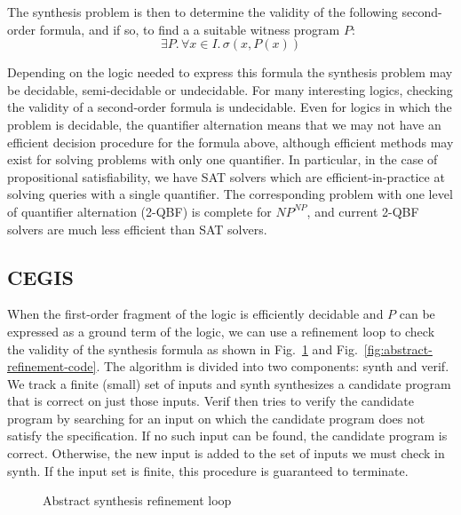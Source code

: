 \documentclass[a4paper]{llncs}
\begin{document}
The synthesis problem is then to determine the validity of the following
second-order formula, and if so, to find a a suitable witness program $P$:
%
$$\exists P .\, \forall x \in I.\, \sigma(x, P(x))$$

Depending on the logic needed to express this formula the synthesis problem
may be decidable, semi-decidable or undecidable.  For many interesting
logics, checking the validity of a second-order formula is undecidable. 
Even for logics in which the problem is decidable, the quantifier
alternation means that we may not have an efficient decision procedure for
the formula above, although efficient methods may exist for solving problems
with only one quantifier.  In particular, in the case of propositional
satisfiability, we have SAT solvers which are efficient-in-practice at
solving queries with a single quantifier.  The corresponding problem with
one level of quantifier alternation (2-QBF) is complete for $NP^{NP}$, and
current 2-QBF solvers are much less efficient than SAT solvers.

\subsection{CEGIS}

When the first-order fragment of the logic is efficiently decidable and $P$ can be
expressed as a ground term of the logic, we can use a refinement loop to check the
validity of the synthesis formula as shown in Fig.~\ref{fig:abstract-refinement} and
Fig.~\ref{fig:abstract-refinement-code}.  The algorithm is divided into two
components: {\sc synth} and {\sc verif}.  We track a finite (small) set of inputs
and {\sc synth} synthesizes a candidate program that is correct on just those inputs.
{\sc Verif} then tries to verify the candidate program by searching for an input on
which the candidate program does not satisfy the specification.  If no such input
can be found, the candidate program is correct.  Otherwise, the new input is added
to the set of inputs we must check in {\sc synth}.  If the input set is finite, this
procedure is guaranteed to terminate.

\begin{figure}
 \centering
 
 \caption{Abstract synthesis refinement loop
 \label{fig:abstract-refinement}}
\end{figure}
\end{document}
